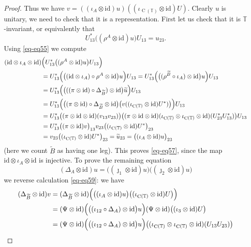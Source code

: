 \documentclass[12pt,reqno,a4paper]{amsart}
\theoremstyle{definition}
\newcommand{\comp}{\circ}
\newcommand{\id}{\mathrm{id}}
\newcommand{\tens}{\otimes}
\newcommand{\TT}{\mathbb{T}}
\DeclareMathOperator{\C}{C}
\numberwithin{equation}{section}
\begin{document}
\begin{proof}
Thus we have $v=((\iota_A\tens\id)u)((\iota_{\C(\TT)}\tens\id)U)$. Clearly $u$ is unitary, we need to check that it is a representation. First let us check that it is $\TT$-invariant, or equivalently that
\begin{equation}\label{eq-eq57}
U_{13}^*\bigl((\rho^A\tens\id)u\bigr)U_{13}=u_{23}.
\end{equation}
Using \eqref{eq-eq55} we compute
\begin{align*}
(\id\tens\iota_A\tens\id)
&
\Bigl(U_{13}^*\bigl((\rho^A\tens\id)u\bigr)U_{13}\Bigr)
\\
&
=U_{13}^*
\Bigl(\bigl((\id\tens\iota_A)\comp\rho^A\tens\id\bigr)u\Bigr)U_{13}
=U_{13}^*\Bigl(\bigl((\rho^{\widetilde{B}}\comp\iota_A)\tens\id\bigr)u\Bigr)U_{13}
\\
&
=U_{13}^*\Bigl(
\bigl(((\pi\tens\id)\comp\Delta_{\widetilde{B}})\tens\id\bigr)\widetilde{u}\Bigr)U_{13}
\\
&
=U_{13}^*\Bigl(\bigl((\pi\tens\id)\comp\Delta_{\widetilde{B}}\tens\id\bigr)
\bigl(v((\iota_{\C(\TT)}\tens\id)U^*)\bigr)\Bigr)U_{13}
\\
&
=U_{13}^*
\bigl((\pi\tens\id\tens\id)(v_{13}v_{23})\bigr)
\bigl((\pi\tens\id\tens\id)(\iota_{\C(\TT)}\tens\iota_{\C(\TT)}\tens\id)(U^*_{23}U^*_{13})\bigr)U_{13}
\\
&
=U_{13}^*\bigl((\pi\tens\id)v\bigr)_{13}v_{23}
\bigl((\iota_{\C(\TT)}\tens\id)U^*\bigr)_{23}\\
&=v_{23}
\bigl((\iota_{\C(\TT)}\tens\id)U^*\bigr)_{23}=\widetilde{u}_{23}
=\bigl((\iota_A\tens\id)u\bigr)_{23}
\end{align*}
(here we count $\widetilde{B}$ as having one leg). This proves \eqref{eq-eq57}, since the map $\id\tens\iota_A\tens\id$ is injective. To prove the remaining equation
\begin{equation}\label{eq-eq58}
(\Delta_A\tens\id)u
=\bigl((\jmath_1\tens\id)u\bigr)\bigl((\jmath_2\tens\id)u\bigr)
\end{equation}
we reverse calculation \eqref{eq-eq59}: we have
\begin{align*}
(\Delta_{\widetilde{B}}\tens\id)v
&=(\Delta_{\widetilde{B}}\tens\id)
\Bigl(
\bigl((\iota_A\tens\id)u\bigr)
\bigl((\iota_{\C(\TT)}\tens\id)U\bigr)
\Bigr)\\
&=(\Psi\tens\id)\Bigl(
\bigl((\iota_{12}\comp\Delta_A)\tens\id\bigr)u
\Bigr)
(\Psi\tens\id)
\bigl((\iota_3\tens\id)U\bigr)
\\
&=(\Psi\tens\id)
\Bigl(
\bigl((\iota_{12}\comp\Delta_A)\tens\id\bigr)u
\Bigr)
\bigl((\iota_{\C(\TT)}\tens\iota_{\C(\TT)}\tens\id)(U_{13}U_{23})\bigr)

\end{align*}
\end{proof}
\end{document}
